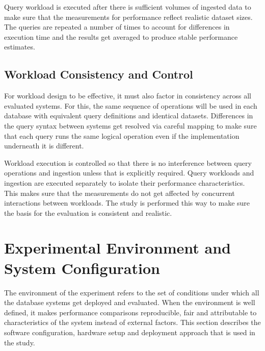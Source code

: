Query workload is executed after there is sufficient volumes of ingested data to make sure that the measurements for performance reflect realistic dataset sizes. The queries are repeated a number of times to account for differences in execution time and the results get averaged to produce stable performance estimates. 





\subsection{Workload Consistency and Control}
For workload design to be effective, it must also factor in consistency across all evaluated systems. For this, the same sequence of operations will be used in each database with equivalent query definitions and identical datasets. Differences in the query syntax between systems get resolved via careful mapping to make sure that each query runs the same logical operation even if the implementation underneath it is different. 

Workload execution is controlled so that there is no interference between query operations and ingestion unless that is explicitly required. Query workloads and ingestion are executed separately to isolate their performance characteristics. This makes sure that the measurements do not get affected by concurrent interactions between workloads. The study is performed this way to make sure the basis for the evaluation is consistent and realistic. 


\section{Experimental Environment and System Configuration}
The environment of the experiment refers to the set of conditions under which all the database systems get deployed and evaluated. When the environment is well defined, it makes performance comparisons reproducible, fair and attributable to characteristics of the system instead of external factors. This section describes the software configuration, hardware setup and deployment approach that is used in the study. 


